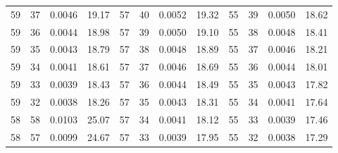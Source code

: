 \begin{tabular}{llll|llll|llll}
59 & 37 & 0.0046 & 19.17 & 57 & 40 & 0.0052 & 19.32 & 55 & 39 & 0.0050 & 18.62\\
59 & 36 & 0.0044 & 18.98 & 57 & 39 & 0.0050 & 19.10 & 55 & 38 & 0.0048 & 18.41\\
59 & 35 & 0.0043 & 18.79 & 57 & 38 & 0.0048 & 18.89 & 55 & 37 & 0.0046 & 18.21\\
59 & 34 & 0.0041 & 18.61 & 57 & 37 & 0.0046 & 18.69 & 55 & 36 & 0.0044 & 18.01\\
59 & 33 & 0.0039 & 18.43 & 57 & 36 & 0.0044 & 18.49 & 55 & 35 & 0.0043 & 17.82\\
59 & 32 & 0.0038 & 18.26 & 57 & 35 & 0.0043 & 18.31 & 55 & 34 & 0.0041 & 17.64\\
58 & 58 & 0.0103 & 25.07 & 57 & 34 & 0.0041 & 18.12 & 55 & 33 & 0.0039 & 17.46\\
58 & 57 & 0.0099 & 24.67 & 57 & 33 & 0.0039 & 17.95 & 55 & 32 & 0.0038 & 17.29\\
\bottomrule
\end{tabular}
\newpage
